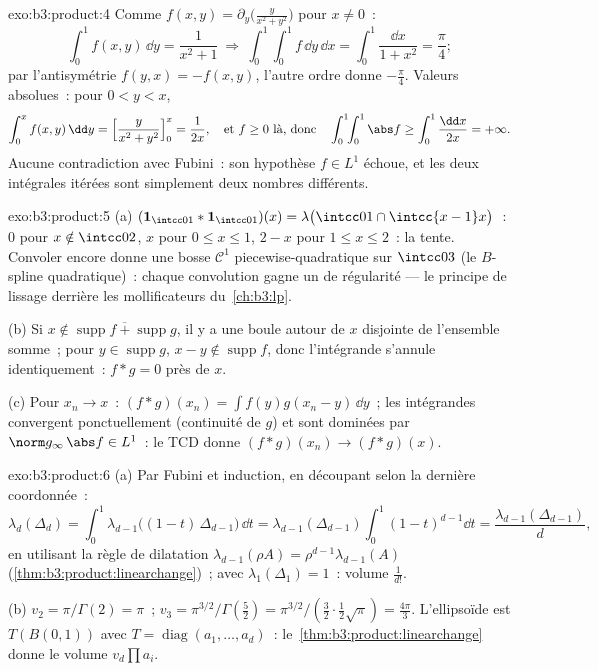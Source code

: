 \begin{solution}{exo:b3:product:4}
Comme $f(x,y) = \partial_y\bigl(\frac{y}{x^2+y^2}\bigr)$ pour
$x \ne 0$~:
\[
\int_0^1 f(x, y)\,\dd y = \frac{1}{x^2 + 1}
\ \Longrightarrow\
\int_0^1\!\!\int_0^1 f\,\dd y\,\dd x =
\int_0^1\frac{\dd x}{1 + x^2} = \frac\pi4 ;
\]
par l'antisymétrie $f(y,x) = -f(x,y)$, l'autre ordre donne
$-\frac\pi4$. Valeurs absolues~: pour $0 < y < x$,
\[
\int_0^x f(x,y)\,\dd y = \Bigl[\frac{y}{x^2 +
y^2}\Bigr]_0^x = \frac1{2x},
\quad\text{et } f \geq 0 \text{ là, donc}\quad
\int_0^1\!\!\int_0^1\abs f \geq \int_0^1\frac{\dd x}{2x} =
+\infty .
\]
Aucune contradiction avec Fubini~: son hypothèse $f \in L^1$
échoue, et les deux intégrales itérées sont simplement deux
nombres différents.
\end{solution}

\begin{solution}{exo:b3:product:5}
(a) $(\mathbf 1_{\intcc01}*\mathbf 1_{\intcc01})(x) =
\lambda\bigl(\intcc01\cap\intcc{x-1}x\bigr)$~: $0$ pour $x
\notin \intcc02$, $x$ pour $0 \leq x \leq 1$, $2 - x$ pour $1
\leq x \leq 2$~: la tente. Convoler encore donne une bosse
$\mathcal C^1$ piecewise-quadratique sur $\intcc03$ (le
$B$-spline quadratique)~: chaque convolution gagne un  de
régularité --- le principe de lissage derrière les
mollificateurs du~\cref{ch:b3:lp}.

(b) Si $x \notin \overline{\operatorname{supp}f +
\operatorname{supp}g}$, il y a une boule autour de $x$
disjointe de l'ensemble somme~; pour $y \in
\operatorname{supp}g$, $x - y \notin\operatorname{supp}f$,
donc l'intégrande s'annule identiquement~: $f * g = 0$ près
de $x$.

(c) Pour $x_n \to x$~: $(f*g)(x_n) = \int
f(y)g(x_n - y)\,\dd y$~; les intégrandes convergent
ponctuellement (continuité de $g$) et sont dominées par
$\norm g_\infty\,\abs f \in L^1$~: le TCD donne $(f*g)(x_n)
\to (f*g)(x)$.
\end{solution}

\begin{solution}{exo:b3:product:6}
(a) Par Fubini et induction, en découpant selon la dernière
coordonnée~:
\[
\lambda_d(\Delta_d) = \int_0^1
\lambda_{d-1}\bigl((1 - t)\,\Delta_{d-1}\bigr)\,\dd t
= \lambda_{d-1}(\Delta_{d-1})\int_0^1(1 - t)^{d-1}\dd t
= \frac{\lambda_{d-1}(\Delta_{d-1})}{d},
\]
en utilisant la règle de dilatation $\lambda_{d-1}(\rho A) =
\rho^{d-1}\lambda_{d-1}(A)$
(\cref{thm:b3:product:linearchange})~; avec
$\lambda_1(\Delta_1) = 1$~: volume $\frac1{d!}$.

(b) $v_2 = \pi/\Gamma(2) = \pi$~; $v_3 =
\pi^{3/2}/\Gamma(\frac52) = \pi^{3/2}/(\frac32\cdot\frac12
\sqrt\pi) = \frac{4\pi}3$. L'ellipsoïde est $T(B(0,1))$ avec
$T = \operatorname{diag}(a_1, \dots, a_d)$~:
le~\cref{thm:b3:product:linearchange} donne le volume
$v_d\prod a_i$.
\end{solution}


